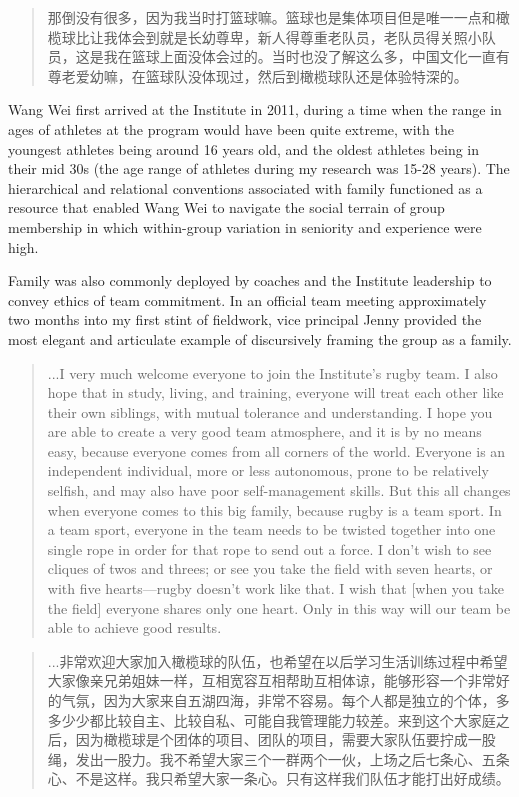\begin{CJK}{UTF8}{gbsn}
    \begin{quote}
       那倒没有很多，因为我当时打篮球嘛。篮球也是集体项目但是唯一一点和橄榄球比让我体会到就是长幼尊卑，新人得尊重老队员，老队员得关照小队员，这是我在篮球上面没体会过的。当时也没了解这么多，中国文化一直有尊老爱幼嘛，在篮球队没体现过，然后到橄榄球队还是体验特深的。
    \end{quote}
Wang Wei first arrived at the Institute in 2011, during a time when the range in ages of athletes at the program would have been quite extreme, with the youngest athletes being around 16 years old, and the oldest athletes being in their mid 30s (the age range of athletes during my research was 15-28 years).
The hierarchical and relational conventions associated with family functioned as a resource that enabled Wang Wei to navigate the social terrain of group membership in which within-group variation in seniority and experience were high.

Family was also commonly deployed by coaches and the Institute leadership to convey ethics of team commitment.  In an official team meeting approximately two months into my first stint of fieldwork, vice principal Jenny provided the most elegant and articulate example of discursively framing the group as a family.
      \begin{quote}
        ...I very much welcome everyone to join the Institute's rugby team. I also hope that in study, living, and training, everyone will treat each other like their own siblings, with mutual tolerance and understanding.  I hope you are able to create a very good team atmosphere, and it is by no means easy, because everyone comes from all corners of the world. Everyone is an independent individual, more or less autonomous, prone to be relatively selfish, and may also have poor self-management skills.  But this all changes when everyone comes to this big family, because rugby is a team sport. In a team sport, everyone in the team needs to be twisted together into one single rope in order for that rope to send out a force. I don't wish to see cliques of twos and threes; or see you take the field with seven hearts, or with five hearts---rugby doesn't work like that. I wish that [when you take the field] everyone shares only one heart. Only in this way will our team be able to achieve good results.
      \end{quote}
      \begin{quote}
        ...非常欢迎大家加入橄榄球的队伍，也希望在以后学习生活训练过程中希望大家像亲兄弟姐妹一样，互相宽容互相帮助互相体谅，能够形容一个非常好的气氛，因为大家来自五湖四海，非常不容易。每个人都是独立的个体，多多少少都比较自主、比较自私、可能自我管理能力较差。来到这个大家庭之后，因为橄榄球是个团体的项目、团队的项目，需要大家队伍要拧成一股绳，发出一股力。我不希望大家三个一群两个一伙，上场之后七条心、五条心、不是这样。我只希望大家一条心。只有这样我们队伍才能打出好成绩。
      \end{quote}


\end{CJK}

